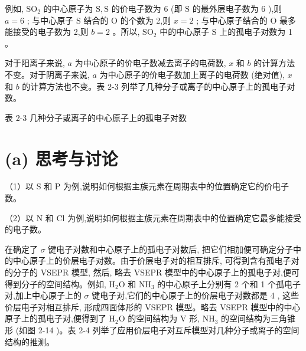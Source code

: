 \documentclass[10pt]{article}
\begin{document}
例如, \({\mathrm{{SO}}}_{2}\) 的中心原子为 \(\mathrm{S},\mathrm{S}\) 的价电子数为 6 (即 \(\mathrm{S}\) 的最外层电子数为 6 ),则 \(a = 6\) ; 与中心原子 \(\mathrm{S}\) 结合的 \(\mathrm{O}\) 的个数为 2,则 \(x = 2\) ; 与中心原子结合的 \(\mathrm{O}\) 最多能接受的电子数为 2,则 \(b = 2\) 。所以, \({\mathrm{{SO}}}_{2}\) 中的中心原子 \(\mathrm{S}\) 上的孤电子对数为 1 。

对于阳离子来说, \(a\) 为中心原子的价电子数减去离子的电荷数, \(x\) 和 \(b\) 的计算方法不变。对于阴离子来说, \(a\) 为中心原子的价电子数加上离子的电荷数 (绝对值), \(x\) 和 \(b\) 的计算方法也不变。表 2-3 列举了几种分子或离子的中心原子上的孤电子对数。

表 2-3 几种分子或离子的中心原子上的孤电子对数

\begin{center}
\end{center}

\section*{(a) 思考与讨论}

（1）以 \(\mathrm{S}\) 和 \(\mathrm{P}\) 为例,说明如何根据主族元素在周期表中的位置确定它的价电子数。

（2）以 \(\mathrm{N}\) 和 \(\mathrm{{Cl}}\) 为例,说明如何根据主族元素在周期表中的位置确定它最多能接受的电子数。

在确定了 \(\sigma\) 键电子对数和中心原子上的孤电子对数后, 把它们相加便可确定分子中的中心原子上的价层电子对数。由于价层电子对的相互排斥, 可得到含有孤电子对的分子的 VSEPR 模型, 然后, 略去 VSEPR 模型中的中心原子上的孤电子对,便可得到分子的空间结构。例如, \({\mathrm{H}}_{2}\mathrm{O}\) 和 \({\mathrm{{NH}}}_{3}\) 的中心原子上分别有 2 个和 1 个孤电子对,加上中心原子上的 \(\sigma\) 键电子对,它们的中心原子上的价层电子对数都是 4 , 这些价层电子对相互排斥, 形成四面体形的 VSEPR 模型。略去 VSEPR 模型中的中心原子上的孤电子对,便得到了 \({\mathrm{H}}_{2}\mathrm{O}\) 的空间结构为 \(\mathrm{V}\) 形, \({\mathrm{{NH}}}_{3}\) 的空间结构为三角锥形 (如图 2-14 )。表 2-4 列举了应用价层电子对互斥模型对几种分子或离子的空间结构的推测。
\end{document}
